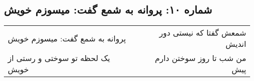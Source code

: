\begin{center}
\section*{شماره ۱۰: پروانه به شمع گفت: میسوزم خویش}
\label{sec:010}
\begin{longtable}{l p{0.5cm} r}
پروانه به شمع گفت: میسوزم خویش
&&
شمعش گفتا که نیستی دور اندیش
\\
یک لحظه تو سوختی و رستی از خویش
&&
من شب تا روز سوختن دارم پیش
\\
\end{longtable}
\end{center}
